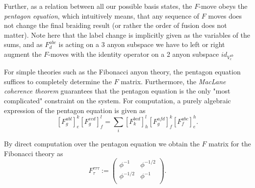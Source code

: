 \documentclass{article}
\begin{document}
Further, as a relation between all our possible basis states, the $F$-move obeys the {\it pentagon equation}, which intuitively means, that any sequence of $F$ moves does not change the final braiding result (or rather the order of fusion does not matter). Note here that the label change is implicitly given as the variables of the sums, and as $F^{abc}_{d}$ is acting on a 3 anyon subspace we have to left or right augment the $F$-moves with the identity operator on a 2 anyon subspace $id_{V^{ab}_{c}}$ 
\begin{center}
\label{grp:pentagon}
\end{center}

For simple theories such as the Fibonacci anyon theory, the pentagon equation suffices to completely determine the $F$ matrix. Furthermore, the {\it MacLane coherence theorem} \cite{mac_lane_categories_1978} guarantees that the pentagon equation is the only "most complicated" constraint on the system. For computation, a purely algebraic expression of the pentagon equation is given as
\[
   \left[ F^{abl}_{g} \right]_{e}^{k} \left[ F^{ecd}_{g} \right]_{f}^{l} = \sum_{i} \left[ F^{bcd}_{k} \right]_{h}^{l} \left[ F^{afd}_{g} \right]_{f}^{k} \left[ F^{abc}_{f} \right]_{e}^{h}.
\]

By direct computation over the pentagon equation we obtain the $F$ matrix for the Fibonacci theory as 
\[
  F^{\tau\tau\tau}_{\tau} := \begin{pmatrix}
    \phi^{-1}  & \phi^{-1 / 2}  \\
    \phi^{-1 / 2} & \phi^{-1}  \\
  \end{pmatrix}.
\]
\end{document}
